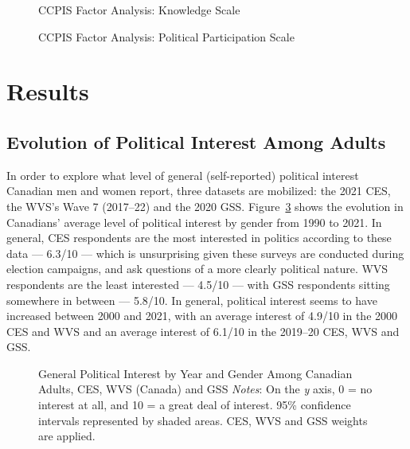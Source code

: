 \documentclass[
  letterpaper,
  DIV=11,
  numbers=noendperiod]{scrreprt}
\begin{document}
\begin{figure}


\caption{\label{fig-factor3}CCPIS Factor Analysis: Knowledge Scale}

\end{figure}%

\begin{figure}


\caption{\label{fig-factor4}CCPIS Factor Analysis: Political
Participation Scale}

\end{figure}%

\section{Results}\label{results}

\subsection{Evolution of Political Interest Among
Adults}\label{evolution-of-political-interest-among-adults}

In order to explore what level of general (self-reported) political
interest Canadian men and women report, three datasets are mobilized:
the 2021 CES, the WVS's Wave 7 (2017--22) and the 2020 GSS.
Figure~\ref{fig-yeargender} shows the evolution in Canadians' average
level of political interest by gender from 1990 to 2021. In general, CES
respondents are the most interested in politics according to these data
--- 6.3/10 --- which is unsurprising given these surveys are conducted
during election campaigns, and ask questions of a more clearly political
nature. WVS respondents are the least interested --- 4.5/10 --- with GSS
respondents sitting somewhere in between --- 5.8/10. In general,
political interest seems to have increased between 2000 and 2021, with
an average interest of 4.9/10 in the 2000 CES and WVS and an average
interest of 6.1/10 in the 2019--20 CES, WVS and GSS.

\begin{figure}


\caption{\label{fig-yeargender}General Political Interest by Year and
Gender Among Canadian Adults, CES, WVS (Canada) and GSS
\newline \textit{Notes}: On the \textit{y} axis, 0 = no interest at all,
and 10 = a great deal of interest. 95\% confidence intervals represented
by shaded areas. CES, WVS and GSS weights are applied.}

\end{figure}%
\end{document}
